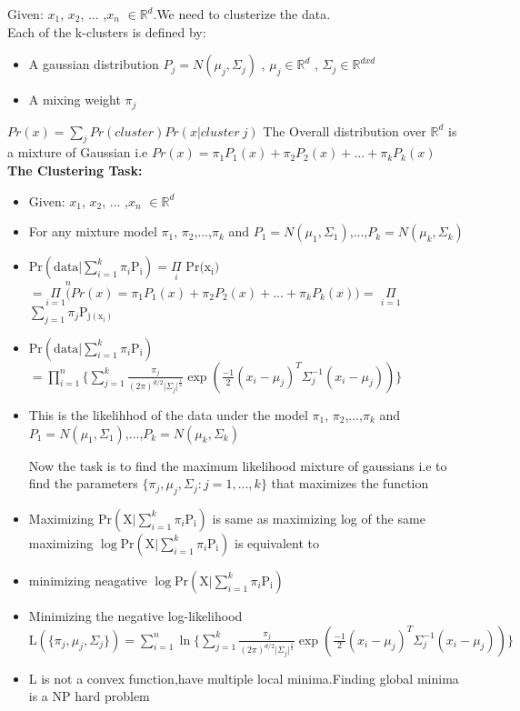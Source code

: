 \documentclass[12pt]{article}
\begin{document}
Given: $x_{1}$, $x_{2}$, ... ,$x_{n}$ $\in \mathbb R^{d}$.We need to clusterize the data.\\Each of the k-clusters is defined by:
\begin{itemize}
	\item A gaussian distribution $P_{j}=N(\mu_{j},\Sigma_{j})$ , $\mu_{j} \in \mathbb R^{d}$ , $\Sigma_{j} \in \mathbb R^{dxd}$ 
     \item	A mixing weight $\pi_{j}$
\end{itemize}
$Pr(x)=\sum_{j}Pr(cluster)Pr(x|cluster \ j)$
The Overall distribution over $\mathbb R^{d}$ is a mixture of Gaussian i.e $Pr(x)=\pi_{1}P_{1}(x)+\pi_{2}P_{2}(x)+...+\pi_{k}P_{k}(x)$\\ \textbf{The Clustering Task:}\\
\begin{itemize}
	\item Given: $x_{1}$, $x_{2}$, ... ,$x_{n}$ $\in \mathbb R^{d}$
	\item For any mixture model $\pi_{1}$, $\pi_{2}$,...,$\pi_{k}$ and $P_{1}=N(\mu_{1},\Sigma_{1})$,...,$P_{k}=N(\mu_{k},\Sigma_{k})$
	
\item	$\mathrm{Pr}(\mathrm{data} \vert \sum_{i=1}^{k}\pi_{i} \mathrm{P_{i}})=\underset{i}\Pi$ $ \mathrm{Pr(x_{i}})$ $ =\underset{i=1 }   \Pi \overset{n}  (Pr(x)=\pi_{1}P_{1}(x)+\pi_{2}P_{2}(x)+...+\pi_{k}P_{k}(x))=$ $\underset{i=1}\Pi $  $\underset{j=1} \sum  \pi_{j}\mathrm{P_{j(x_{i})}} $
	
	
 \item	$\mathrm{Pr}(\mathrm{data} \vert \sum_{i=1}^{k}\pi_{i} \mathrm{P_{i}})$
	$=\prod_{i=1}^{n}\{\sum_{j=1}^{k}\frac{\pi_{j}}{(2\pi)^{d/2} \vert \Sigma_{j}\vert^{\frac{1}{2}}  } 
	\exp (\frac{-1}{2} (x_{i}-\mu_{j})^{T}\Sigma_{j}^{-1}(x_{i}-\mu_{j}))\}$
	
	\item This is the likelihhod of the data under the model $\pi_{1}$, $\pi_{2}$,...,$\pi_{k}$ and $P_{1}=N(\mu_{1},\Sigma_{1})$,...,$P_{k}=N(\mu_{k},\Sigma_{k})$
	
	
	Now the task is to find the maximum likelihood mixture of gaussians i.e to find the parameters $\{\pi_{j},\mu_{j},\Sigma_{j}:j=1,...,k\}$ that maximizes the function
	
\item	Maximizing $\mathrm{Pr}(\mathrm{X} \vert \sum_{i=1}^{k}\pi_{i} \mathrm{P_{i}})$  is same as maximizing log of the same maximizing $\log \mathrm{Pr}(\mathrm{X} \vert \sum_{i=1}^{k}\pi_{i} \mathrm{P_{i}})$ is equivalent to \item minimizing neagative $\log \mathrm{Pr}(\mathrm{X} \vert \sum_{i=1}^{k}\pi_{i} \mathrm{P_{i}})$ 
\item Minimizing the negative log-likelihood \\
	$\mathrm{L}(\{\pi_{j},\mu_{j},\Sigma_{j} \})=\sum_{i=1}^{n} \ln \{\sum_{j=1}^{k}\frac{\pi_{j}}{(2\pi)^{d/2} \vert \Sigma_{j}\vert^{\frac{1}{2}}  } 
	\exp (\frac{-1}{2} (x_{i}-\mu_{j})^{T}\Sigma_{j}^{-1}(x_{i}-\mu_{j}))\} $
	
	\item L is not a convex function,have multiple local minima.Finding global minima is a NP hard problem
\end{itemize}
\end{document}
